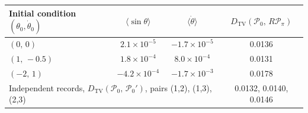 \begin{tabular}{lccc}
\toprule
Initial condition $(\theta_0,\dot\theta_0)$ & $\langle\sin\theta\rangle$ & $\langle\dot\theta\rangle$ & $D_{\mathrm{TV}}(\mathcal P_0,\,R\mathcal P_{\pi})$\\
\midrule
$(0,\,0)$ & $2.1\times10^{-5}$ & $-1.7\times10^{-5}$ & 0.0136\\
$(1,\,-0.5)$ & $1.8\times10^{-4}$ & $8.0\times10^{-4}$ & 0.0131\\
$(-2,\,1)$ & $-4.2\times10^{-4}$ & $-1.7\times10^{-3}$ & 0.0178\\
\midrule
\multicolumn{3}{l}{Independent records, $D_{\mathrm{TV}}(\mathcal P_0,\,\mathcal P_0')$, pairs (1,2), (1,3), (2,3)} & 0.0132, 0.0140, 0.0146\\
\bottomrule
\end{tabular}
